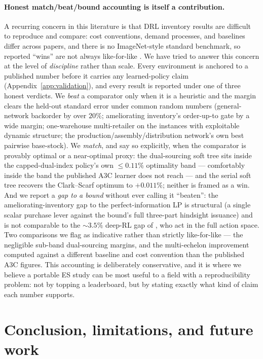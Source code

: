 \paragraph{Honest match/beat/bound accounting is itself a contribution.}
A recurring concern in this literature is that DRL inventory results are difficult to reproduce and
compare: cost conventions, demand processes, and baselines differ across papers, and there is no
ImageNet-style standard benchmark, so reported ``wins'' are not always like-for-like
\citep{boute2022deep,alvo2023networks}. We have tried to answer this concern at the level of
\emph{discipline} rather than scale. Every environment is anchored to a published number before it
carries any learned-policy claim (Appendix~\ref{app:validation}), and every result is reported under
one of three honest verdicts. We \emph{beat} a comparator only when it is a heuristic and the margin
clears the held-out standard error under common random numbers (general-network backorder by over
$20\%$; ameliorating inventory's order-up-to gate by a wide margin; one-warehouse multi-retailer on the
instances with exploitable dynamic structure; the production/assembly/distribution network's own best
pairwise base-stock). We \emph{match}, and say so explicitly, when the comparator is provably optimal
or a near-optimal proxy: the dual-sourcing soft tree sits inside the capped-dual-index policy's own
$\le 0.11\%$ optimality band --- comfortably inside the band the published A3C learner does not reach
--- and the serial soft tree recovers the Clark--Scarf optimum to $+0.011\%$; neither is framed as a
win. And we report a \emph{gap to a bound} without ever calling it ``beaten'': the ameliorating-inventory
gap to the perfect-information LP is structural (a single scalar purchase lever against the bound's full
three-part hindsight issuance) and is not comparable to the $\sim\!3.5\%$ deep-RL gap of
\citet{pahrGrunow2025}, who act in the full action space. Two comparisons we flag as indicative rather
than strictly like-for-like --- the negligible sub-band dual-sourcing margins, and the multi-echelon
improvement computed against a different baseline and cost convention than the published A3C figures.
This accounting is deliberately conservative, and it is where we believe a portable ES study can be
most useful to a field with a reproducibility problem: not by topping a leaderboard, but by stating
exactly what kind of claim each number supports.

\section{Conclusion, limitations, and future work}
\label{sec:conclusion}

